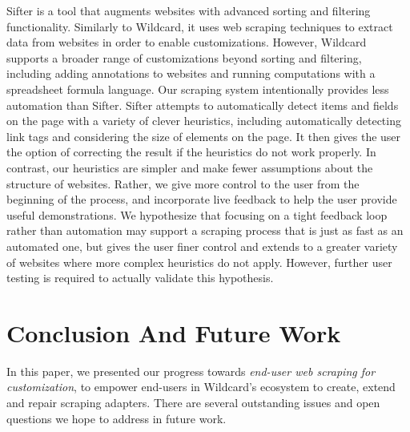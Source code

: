 \documentclass[sigconf,10pt]{acmart}
\begin{document}
Sifter \citep{huynh2006} is a tool that augments websites with advanced
sorting and filtering functionality. Similarly to Wildcard, it uses web
scraping techniques to extract data from websites in order to enable
customizations. However, Wildcard supports a broader range of
customizations beyond sorting and filtering, including adding
annotations to websites and running computations with a spreadsheet
formula language. Our scraping system intentionally provides less
automation than Sifter. Sifter attempts to automatically detect items
and fields on the page with a variety of clever heuristics, including
automatically detecting link tags and considering the size of elements
on the page. It then gives the user the option of correcting the result
if the heuristics do not work properly. In contrast, our heuristics are
simpler and make fewer assumptions about the structure of websites.
Rather, we give more control to the user from the beginning of the
process, and incorporate live feedback to help the user provide useful
demonstrations. We hypothesize that focusing on a tight feedback loop
rather than automation may support a scraping process that is just as
fast as an automated one, but gives the user finer control and extends
to a greater variety of websites where more complex heuristics do not
apply. However, further user testing is required to actually validate
this hypothesis.

\hypertarget{sec:conclusion}{%
\section{Conclusion And Future Work}\label{sec:conclusion}}

In this paper, we presented our progress towards \emph{end-user web
scraping for customization}, to empower end-users in Wildcard's
ecosystem to create, extend and repair scraping adapters. There are
several outstanding issues and open questions we hope to address in
future work.
\end{document}
